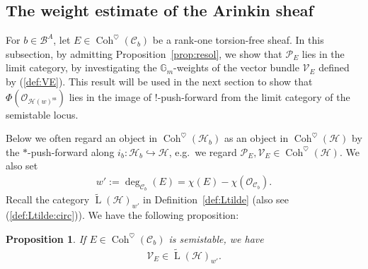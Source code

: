 \documentclass[11pt,oneside,a4paper,mathscr]{amsart}
\newtheorem{prop}[thm]{Proposition}
\theoremstyle{definition}
\newcommand{\LL}{\operatorname{L}}
\newcommand{\cH}{\mathcal{H}}
\newcommand{\cB}{\mathcal{B}}
\newcommand{\cC}{\mathcal{C}}
\newcommand{\cP}{\mathcal{P}}
\newcommand{\Coh}{\operatorname{Coh}}
\begin{document}
\subsection{The weight estimate of the Arinkin sheaf}
For $b\in \cB^A$, let $E\in \Coh^{\heartsuit}(\cC_b)$ be a rank-one 
torsion-free sheaf. 
In this subsection, by admitting Proposition~\ref{prop:resol}, we show that $\cP_E$ lies in the limit category, 
by investigating the $\mathbb{G}_m$-weights of the vector bundle $\mathcal{V}_E$ defined by (\ref{def:VE}). This result will be used 
in the next section to show that $\Phi(\mathcal{O}_{\cH(w)^{\mathrm{ss}}})$
lies in the image of $!$-push-forward from the limit category of the semistable locus. 

Below we often regard an object in $\Coh^{\heartsuit}(\cH_b)$
as an object in $\Coh^{\heartsuit}(\cH)$ by the $*$-push-forward along 
$i_b \colon \cH_b \hookrightarrow \cH$, e.g.\ we regard $\cP_E, \mathcal{V}_E \in \Coh^{\heartsuit}(\cH)$. 
We also set 
\begin{align*}w' :=\deg_{\cC_b}(E)=\chi(E)-\chi(\mathcal{O}_{\cC_b}).
\end{align*}
Recall the category $\widetilde{\LL}(\cH)_{w'}$ in Definition~\ref{def:Ltilde} (also see (\ref{def:Ltilde:circ})). We have the 
following proposition: 
\begin{prop}\label{prop:VE}
If $E\in \Coh^{\heartsuit}(\cC_b)$ is semistable, we have 
\begin{align}\label{VE:semistable}
\mathcal{V}_E \in \widetilde{\LL}(\cH)_{w'}. 
\end{align}
\end{prop}
\end{document}
